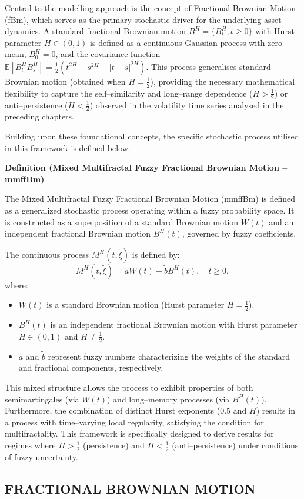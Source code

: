 \documentclass[12pt,a4paper]{report}
\numberwithin{equation}{section}
\begin{document}
Central to the modelling approach is the concept of Fractional Brownian Motion (fBm), which serves as the primary stochastic driver for the underlying asset dynamics. A standard fractional Brownian motion $B^H = \{B^H_t, t \geq 0\}$ with Hurst parameter $H \in (0, 1)$ is defined as a continuous Gaussian process with zero mean, $B^H_0 = 0$, and the covariance function $\mathbb{E}[B^H_t B^H_s] = \frac{1}{2}(t^{2H} + s^{2H} - |t-s|^{2H})$. This process generalises standard Brownian motion (obtained when $H = \frac{1}{2}$), providing the necessary mathematical flexibility to capture the self--similarity and long--range dependence ($H > \frac{1}{2}$) or anti--persistence ($H < \frac{1}{2}$) observed in the volatility time series analysed in the preceding chapters.

Building upon these foundational concepts, the specific stochastic process utilised in this framework is defined below.

\textbf{Definition (Mixed Multifractal Fuzzy Fractional Brownian Motion -- mmffBm)}

The Mixed Multifractal Fuzzy Fractional Brownian Motion (mmffBm) is defined as a generalized stochastic process operating within a fuzzy probability space. It is constructed as a superposition of a standard Brownian motion $W(t)$ and an independent fractional Brownian motion $B^H(t)$, governed by fuzzy coefficients.

The continuous process $M^H(t, \tilde{\xi})$ is defined by:
\begin{equation}
    M^H(t, \tilde{\xi}) = \tilde{a} W(t) + \tilde{b} B^H(t), \quad t \ge 0,
\end{equation}
where:
\begin{itemize}
    \item $W(t)$ is a standard Brownian motion (Hurst parameter $H = \frac{1}{2}$).
    \item $B^H(t)$ is an independent fractional Brownian motion with Hurst parameter $H \in (0, 1)$ and $H \neq \frac{1}{2}$.
    \item $\tilde{a}$ and $\tilde{b}$ represent fuzzy numbers characterizing the weights of the standard and fractional components, respectively.
\end{itemize}

This mixed structure allows the process to exhibit properties of both semimartingales (via $W(t)$) and long--memory processes (via $B^H(t)$). Furthermore, the combination of distinct Hurst exponents ($0.5$ and $H$) results in a process with time--varying local regularity, satisfying the condition for multifractality. This framework is specifically designed to derive results for regimes where $H > \frac{1}{2}$ (persistence) and $H < \frac{1}{2}$ (anti--persistence) under conditions of fuzzy uncertainty.
\hypertarget{fractional--brownian--motion}{%
\subsection{FRACTIONAL BROWNIAN
MOTION}\label{fractional--brownian--motion}}
\end{document}

